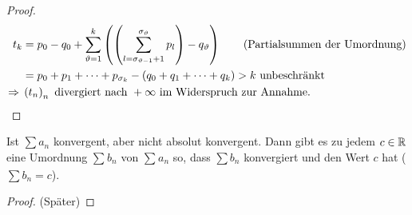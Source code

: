 \begin{satz}[Dirichlet 1837]
\begin{proof}
\begin{align*}
            t_{k} &= p_0 - q_0 + \sum_{\vartheta = 1}^{k}\left( \left(\sum_{l=\sigma_{\vartheta - 1} + 1}^{\sigma_{\vartheta}} p_l\right) - q_{\vartheta}\right)\tag{Partialsummen der Umordnung}\\
            &= p_0 + p_1 + \dots + p_{\sigma_k} - \left(q_0 + q_1 + \dots + q_k\right) > k \text{ unbeschränkt}\\
            \Rightarrow{} &\left(t_n\right)_n \text{ divergiert nach } +\infty \text { im Widerspruch zur Annahme.}\\
        \end{align*}
    \end{proof}
\end{satz}


\begin{satz}
    \marginnote{[14. Dez]}
    Ist $\sum a_n$ konvergent, aber nicht absolut konvergent. Dann gibt es zu jedem $c\in\mathbb{R}$ eine Umordnung $\sum_{}^{} b_n$ von $\sum_{}^{} a_n$ so, dass $\sum b_n$ konvergiert und den Wert $c$ hat ($\sum b_n = c$).

    \begin{proof}
    (Später)
    \end{proof}
\end{satz}

\newpage